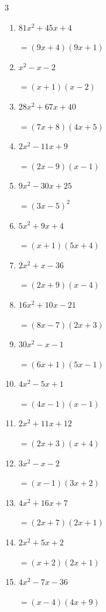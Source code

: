\begin{multicols}{3}
\begin{enumerate}
        $=(7x-5)(5x-7)$

  \item $81x^{2}+45x+4$

        $=(9x+4)(9x+1)$

  \item $x^{2}-x-2$

        $=(x+1)(x-2)$

  \item $28x^{2}+67x+40$

        $=(7x+8)(4x+5)$

  \item $2x^{2}-11x+9$

        $=(2x-9)(x-1)$

  \item $9x^{2}-30x+25$

        $=(3x-5)^{2}$

\columnbreak %

  \item $5x^{2}+9x+4$

        $=(x+1)(5x+4)$

  \item $2x^{2}+x-36$

        $=(2x+9)(x-4)$

  \item $16x^{2}+10x-21$

        $=(8x-7)(2x+3)$

  \item $30x^{2}-x-1$

        $=(6x+1)(5x-1)$

  \item $4x^{2}-5x+1$

        $=(4x-1)(x-1)$

  \item $2x^{2}+11x+12$

        $=(2x+3)(x+4)$

  \item $3x^{2}-x-2$

        $=(x-1)(3x+2)$

  \item $4x^{2}+16x+7$

        $=(2x+7)(2x+1)$

  \item $2x^{2}+5x+2$

        $=(x+2)(2x+1)$

  \item $4x^{2}-7x-36$

        $=(x-4)(4x+9)$

\end{enumerate}
\end{multicols}
